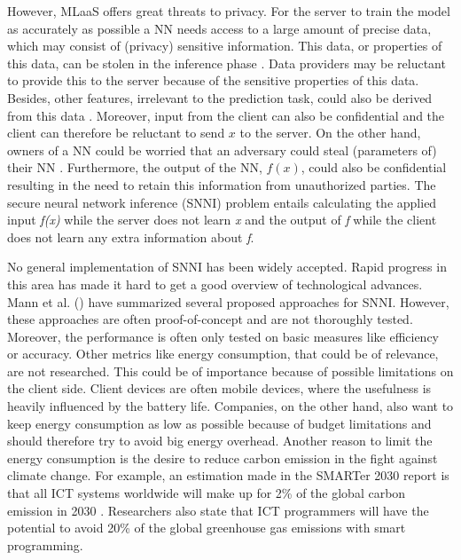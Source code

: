 \documentclass[../thesis.tex]{subfiles}
\begin{document}
However, MLaaS offers great threats to privacy. For the server to train the model as accurately as possible a NN needs access to a large amount of precise data, which may consist of (privacy) sensitive information. This data, or properties of this data, can be stolen in the inference phase \parencite{qayyum2020}. Data providers may be reluctant to provide this to the server because of the sensitive properties of this data. Besides, other features, irrelevant to the prediction task, could also be derived from this data \parencite{nasr2019}. Moreover, input from the client can also be confidential and the client can therefore be reluctant to send $x$ to the server. On the other hand, owners of a NN could be worried that an adversary could steal (parameters of) their NN \parencite{qayyum2020}. Furthermore, the output of the NN, $f(x)$, could also be confidential resulting in the need to retain this information from unauthorized parties. The secure neural network inference (SNNI) problem entails calculating the applied input \textit{f(x)} while the server does not learn \textit{x} and the output of \textit{f} while the client does not learn any extra information about \textit{f}. 


No general implementation of SNNI has been widely accepted. Rapid progress in this area has made it hard to get a good overview of technological advances. Mann et al. (\citeyear{mann22}) have summarized several proposed approaches for SNNI. However, these approaches are often proof-of-concept and are not thoroughly tested. Moreover, the performance is often only tested on basic measures like efficiency or accuracy. Other metrics like energy consumption, that could be of relevance, are not researched. This could be of importance because of possible limitations on the client side. Client devices are often mobile devices, where the usefulness is heavily influenced by the battery life. Companies, on the other hand, also want to keep energy consumption as low as possible because of budget limitations and should therefore try to avoid big energy overhead. Another reason to limit the energy consumption is the desire to reduce carbon emission in the fight against climate change. For example, an estimation made in the SMARTer 2030 report is that all ICT systems worldwide will make up for 2\% of the global carbon emission in 2030 \parencite{smarter2015}. Researchers also state that ICT programmers will have the potential to avoid 20\% of the global greenhouse gas emissions with smart programming. 
\end{document}
